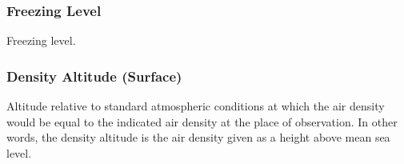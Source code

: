\documentclass[11pt,a4paper]{article}
\begin{document}
\subsubsection{Freezing Level}
Freezing level.
\subsubsection{Density Altitude (Surface)}
Altitude relative to standard atmospheric conditions at which the air density would be equal to the indicated air density at the place of observation. In other words, the density altitude is the air density given as a height above mean sea level.
\end{document}
